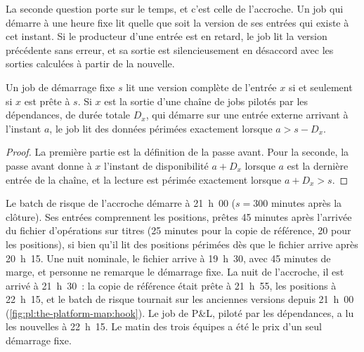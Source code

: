 La seconde question porte sur le temps, et c'est celle de l'accroche. Un job qui démarre à une heure fixe lit quelle que soit la version de ses
entrées qui existe à cet instant. Si le producteur d'une entrée est en retard, le job lit la version précédente sans erreur, et sa sortie
est silencieusement en désaccord avec les sorties calculées à partir de la nouvelle.

\begin{proposition}\label{prop:pl:the-platform-map:stale}
Un job de démarrage fixe $s$ lit une version complète de l'entrée $x$ si et seulement si $x$ est prête à $s$. Si $x$ est la sortie d'une
chaîne de jobs pilotés par les dépendances, de durée totale $D_x$, qui démarre sur une entrée externe arrivant à l'instant $a$, le job lit
des données périmées exactement lorsque $a > s - D_x$.
\end{proposition}

\begin{proof}
La première partie est la définition de la passe avant. Pour la seconde, la passe avant donne à $x$ l'instant de disponibilité $a + D_x$ lorsque
$a$ est la dernière entrée de la chaîne, et la lecture est périmée exactement lorsque $a + D_x > s$.
\end{proof}

Le batch de risque de l'accroche démarre à 21~h~00 ($s = 300$ minutes après la clôture). Ses entrées comprennent les positions, prêtes 45
minutes après l'arrivée du fichier d'opérations sur titres (25 minutes pour la copie de référence, 20 pour les positions), si bien qu'il lit des positions
périmées dès que le fichier arrive après 20~h~15. Une nuit nominale, le fichier arrive à 19~h~30, avec 45 minutes de marge, et personne ne remarque le
démarrage fixe. La nuit de l'accroche, il est arrivé à 21~h~30~: la copie de référence était prête à 21~h~55, les positions à 22~h~15, et le batch de risque
tournait sur les anciennes versions depuis 21~h~00 (\cref{fig:pl:the-platform-map:hook}). Le job de P\&L, piloté par les dépendances, a lu
les nouvelles à 22~h~15. Le matin des trois équipes a été le prix d'un seul démarrage fixe.


